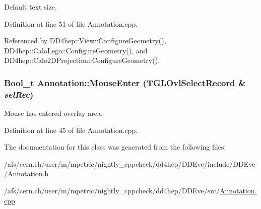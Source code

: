 Default text size. 

Definition at line 51 of file Annotation.cpp.

Referenced by DD4hep::View::ConfigureGeometry(), DD4hep::CaloLego::ConfigureGeometry(), and DD4hep::Calo2DProjection::ConfigureGeometry().\hypertarget{class_d_d4hep_1_1_annotation_a08d3cc154321a9410f62e38d42a918f0}{
\subsubsection[{MouseEnter}]{\setlength{\rightskip}{0pt plus 5cm}Bool\_\-t Annotation::MouseEnter (TGLOvlSelectRecord \& {\em selRec})}}
\label{class_d_d4hep_1_1_annotation_a08d3cc154321a9410f62e38d42a918f0}


Mouse has entered overlay area. 

Definition at line 45 of file Annotation.cpp.

The documentation for this class was generated from the following files:\begin{DoxyCompactItemize}
\item 
/afs/cern.ch/user/m/mpetric/nightly\_\-cppcheck/dd4hep/DDEve/include/DDEve/\hyperlink{_annotation_8h}{Annotation.h}\item 
/afs/cern.ch/user/m/mpetric/nightly\_\-cppcheck/dd4hep/DDEve/src/\hyperlink{_annotation_8cpp}{Annotation.cpp}\end{DoxyCompactItemize}
